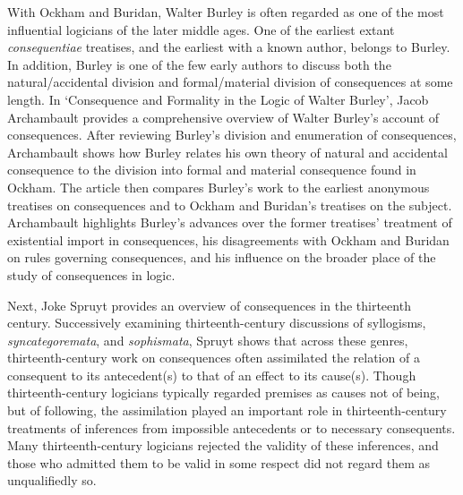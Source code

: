 \documentclass[]{article}
\begin{document}
With Ockham and Buridan, Walter Burley is often regarded as one of the most influential logicians of the later middle ages. One of the earliest extant \textit{consequentiae} treatises, and the earliest with a known author, belongs to Burley. In addition, Burley is one of the few early authors to discuss both the natural/accidental division and formal/material division of consequences at some length. In `Consequence and Formality in the Logic of Walter Burley', Jacob Archambault provides a comprehensive overview of Walter Burley's account of consequences. After reviewing Burley's division and enumeration of consequences, Archambault shows how Burley relates his own theory of natural and accidental consequence to the division into formal and material consequence found in Ockham. The article then compares Burley's work to the earliest anonymous treatises on consequences and to Ockham and Buridan's treatises on the subject. Archambault highlights Burley's advances over the former treatises' treatment of existential import in consequences, his disagreements with Ockham and Buridan on rules governing consequences, and his influence on the broader place of the study of consequences in logic. 

Next, Joke Spruyt provides an overview of consequences in the thirteenth century. Successively examining thirteenth-century discussions of syllogisms, \textit{syncategoremata}, and \textit{sophismata}, Spruyt shows that across these genres, thirteenth-century work on consequences often assimilated the relation of a consequent to its antecedent(s) to that of an effect to its cause(s). Though thirteenth-century logicians typically regarded premises as causes not of being, but of following, the assimilation played an important role in thirteenth-century treatments of inferences from impossible antecedents or to necessary consequents. Many thirteenth-century logicians rejected the validity of these inferences, and those who admitted them to be valid in some respect did not regard them as unqualifiedly so.
\end{document}
